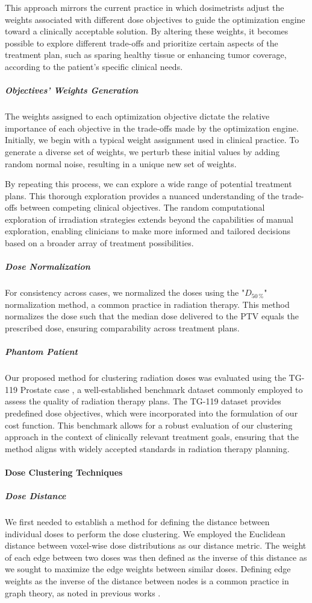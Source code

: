 This approach mirrors the current practice in which dosimetrists adjust the weights associated with different dose objectives to guide the optimization engine toward a clinically acceptable solution.
By altering these weights, it becomes possible to explore different trade-offs and prioritize certain aspects of the treatment plan, such as sparing healthy tissue or enhancing tumor coverage, according to the patient's specific clinical needs.

\subparagraph{Objectives’ Weights Generation}
The weights assigned to each optimization objective dictate the relative importance of each objective in the trade-offs made by the optimization engine.
Initially, we begin with a typical weight assignment used in clinical practice.
To generate a diverse set of weights, we perturb these initial values by adding random normal noise, resulting in a unique new set of weights.

By repeating this process, we can explore a wide range of potential treatment plans.
This thorough exploration provides a nuanced understanding of the trade-offs between competing clinical objectives.
The random computational exploration of irradiation strategies extends beyond the capabilities of manual exploration, enabling clinicians to make more informed and tailored decisions based on a broader array of treatment possibilities.

\subparagraph{Dose Normalization}
For consistency across cases, we normalized the doses using the "$D_{50\,\%}$" normalization method, a common practice in radiation therapy.
This method normalizes the dose such that the median dose delivered to the PTV equals the prescribed dose, ensuring comparability across treatment plans.

\subparagraph{Phantom Patient}
Our proposed method for clustering radiation doses was evaluated using the TG-119 Prostate case \cite{AAPM-TG119}, a well-established benchmark dataset commonly employed to assess the quality of radiation therapy plans.
The TG-119 dataset provides predefined dose objectives, which were incorporated into the formulation of our cost function.
This benchmark allows for a robust evaluation of our clustering approach in the context of clinically relevant treatment goals, ensuring that the method aligns with widely accepted standards in radiation therapy planning.

\paragraph{Dose Clustering Techniques}
\subparagraph{Dose Distance}
We first needed to establish a method for defining the distance between individual doses to perform the dose clustering.
We employed the Euclidean distance between voxel-wise dose distributions as our distance metric.
The weight of each edge between two doses was then defined as the inverse of this distance as we sought to maximize the edge weights between similar doses.
Defining edge weights as the inverse of the distance between nodes is a common practice in graph theory, as noted in previous works \cite{Maleika2020} \cite{Li2018}.

